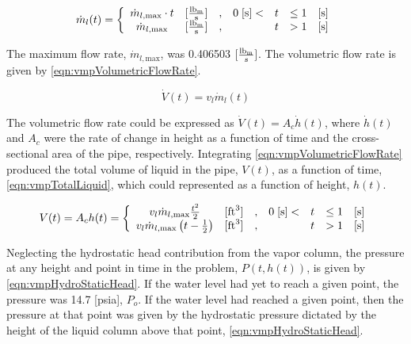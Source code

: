 \begin{equation}
\label{eqn:vmpMassFlowRate}
\dot{m}_{l}(t) = \left\{
\begin{array}{cclrcll}
 \dot{m}_{l,\text{max}}\cdot t & [\frac{ \lbm{} }{\text{s}}] & , & 0\; [\text{s}] < & t & \leq 1 & [\text{s}] \\
 \dot{m}_{l,\text{max}}        & [\frac{ \lbm{} }{\text{s}}] & , &                  & t & > 1    & [\text{s}]
\end{array}\right.
\end{equation}

The maximum flow rate, $\dot{m}_{l,\text{max}}$, was 0.406503 $ [ \frac{\lbm{}}{s} ]$.
The volumetric flow rate is given by \eqref{eqn:vmpVolumetricFlowRate}.

\begin{equation}
\label{eqn:vmpVolumetricFlowRate}
\dot{V}(t) = v_{l} \dot{m}_{l}(t)
\end{equation}

The volumetric flow rate could be expressed as $\dot{V}(t) = A_{c} \dot{h}(t)$, where $\dot{h}(t)$ and $A_{c}$ were the rate of change in height as a function of time and the cross-sectional area of the pipe, respectively.
Integrating \eqref{eqn:vmpVolumetricFlowRate} produced the total volume of liquid in the pipe, $V(t)$, as a function of time, \eqref{eqn:vmpTotalLiquid}, which could represented as a function of height, $h(t)$.

\begin{equation}
\label{eqn:vmpTotalLiquid}
V(t) = A_{c} h(t) = 
 \left\{
\begin{array}{cclrcll}
v_{l} \dot{m}_{l,\text{max}}\frac{t^{2}}{2} & [ \text{ft}^{3} ] & , & 0\; [\text{s}] < & t & \leq 1 & [\text{s}] \\
v_{l} \dot{m}_{l,\text{max}} \left( t - \onehalf  \right) & [ \text{ft}^{3} ] & , &                  & t & > 1    & [\text{s}]
\end{array}\right.
\end{equation}

Neglecting the hydrostatic head contribution from the vapor column, the pressure at any height and point in time in the problem, $P(t, h(t))$, is given by \eqref{eqn:vmpHydroStaticHead}.
If the water level had yet to reach a given point, the pressure was  14.7 [psia], $P_o$.
If the water level had reached a given point, then the pressure at that point was given by the hydrostatic pressure dictated by the height of the liquid column above that point, \eqref{eqn:vmpHydroStaticHead}.

